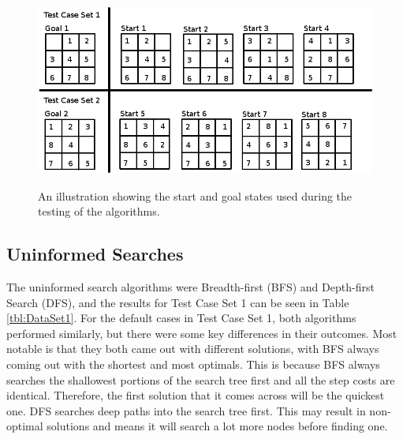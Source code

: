 \documentclass[12pt]{article}
\begin{document}
\begin{figure}[h]
	\begin{center}
		\includegraphics[scale=0.4]{Images/test_grids.png}
		\label{fig:testcases}
		\caption{An illustration showing the start and goal states used during the testing of the algorithms.}
	\end{center}
\end{figure}

\subsection{Uninformed Searches}
The uninformed search algorithms were Breadth-first (BFS) and Depth-first Search (DFS), and the results for Test Case Set 1 can be seen in Table \ref{tbl:DataSet1}. For the default cases in Test Case Set 1, both algorithms performed similarly, but there were some key differences in their outcomes. Most notable is that they both came out with different solutions, with BFS always coming out with the shortest and most optimals. This is because BFS always searches the shallowest portions of the search tree first and all the step costs are identical. Therefore, the first solution that it comes across will be the quickest one. DFS searches deep paths into the search tree first. This may result in non-optimal solutions and means it will search a lot more nodes before finding one. 
\end{document}
